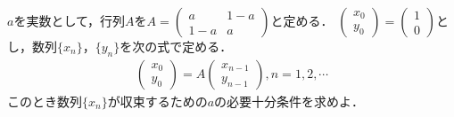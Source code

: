 $a$を実数として，行列$A$を$A=\begin{pmatrix}a&1-a \\ 1-a&a \end{pmatrix}$と定める．
$\begin{pmatrix}x_0 \\ y_0  \end{pmatrix}=\begin{pmatrix} 1 \\ 0  \end{pmatrix}$とし，数列$\{x_n\}$，$\{y_n\}$を次の式で定める．
\begin{align*}
  \begin{pmatrix}
    x_0 \\ y_0
  \end{pmatrix}
  =A
  \begin{pmatrix}
    x_{n-1} \\
    y_{n-1}
  \end{pmatrix},
  n=1,2,\cdots
\end{align*}
このとき数列$\{x_n\}$が収束するための$a$の必要十分条件を求めよ．
